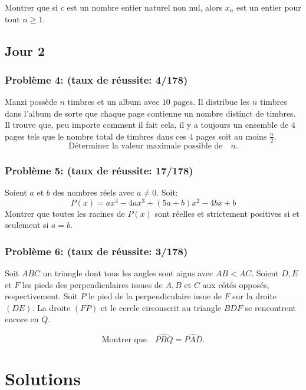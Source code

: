 \documentclass[12pt,a4paper,article]{memoir}
\begin{document}
Montrer que si $c$ est un nombre entier naturel non nul, alors $x_{n}$ est un entier pour tout $n \geq 1$.

\section{Jour 2}
\subsection{Problème 4: (taux de réussite: 4/178)}
Manzi possède $n$ timbres et un album avec $10$ pages. Il distribue les $n$ timbres dans l'album de sorte que chaque page contienne un nombre distinct de timbres. Il trouve que, peu importe comment il fait cela, il y a toujours un ensemble de $4$ pages tels que le nombre total de timbres dans ces $4$ pages soit au moins $\frac{n}{2}$.
\begin{equation}
\textrm{Déterminer la valeur maximale possible de} \quad n.
\end{equation}

\subsection{Problème 5: (taux de réussite: 17/178)}
Soient $a$ et $b$ des nombres réels avec $a \neq 0$. Soit:
\begin{equation}
P(x) = ax^4 - 4ax^3 + (5a + b)x^2 - 4bx + b
\end{equation}
Montrer que toutes les racines de $P(x)$ sont réelles et strictement positives si et seulement si $a=b$.

\subsection{Problème 6: (taux de réussite: 3/178)}
Soit $ABC$ un triangle dont tous les angles sont aigus avec $AB < AC$. Soient $D, E$ et $F$ les pieds des perpendiculaires issues de $A, B$ et $C$ aux côtés opposés, respectivement. Soit $P$ le pied de la perpendiculaire issue de $F$ sur la droite $(DE)$. La droite $(FP)$ et le cercle circonscrit au triangle $BDF$ se rencontrent encore en $Q$.

\begin{equation}
\textrm{Montrer que} \quad \widehat{PBQ} = \widehat{PAD}.
\end{equation}

\chapter{Solutions}
\end{document}
